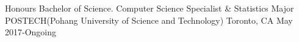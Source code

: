 

\begin{cventries}

  \cventry
    {Honours Bachelor of Science. Computer Science Specialist & Statistics Major} %
    {POSTECH(Pohang University of Science and Technology)} %
    {Toronto, CA} %
    {May 2017-Ongoing} %

\end{cventries}
